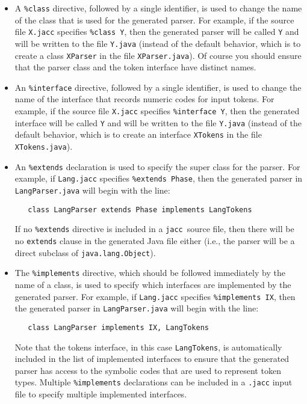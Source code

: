 \documentclass[12pt]{article}
\def\jacc{{\tt jacc}}
\begin{document}
\begin{itemize}
      Note that \jacc\ does not attempt to determine if the text
      in a code block is valid; errors will not be detected until
      you attempt to compile the generated source files.

\item A \verb"%class" directive, followed by a single identifier,
      is used to change the name of the class that is used for
      the generated parser.  For example, if the source file
      \verb"X.jacc" specifies \verb"%class Y", then the generated
      parser will be called \verb"Y" and will be written to
      the file \verb"Y.java" (instead of the default behavior, which
      is to create a class \verb"XParser" in the file \verb"XParser.java").
      Of course you should ensure that the parser class and the token
      interface have distinct names.

\item An \verb"%interface" directive, followed by a single identifier,
      is used to change the name of the interface that 
      records numeric codes for input tokens.  For example, if the
      source file \verb"X.jacc" specifies \verb"%interface Y", then
      the generated interface will be called \verb"Y" and will be
      written to the file \verb"Y.java" (instead of the default
      behavior, which is to create an interface \verb"XTokens"
      in the file \verb"XTokens.java").

\item An \verb"%extends" declaration is used to specify the super class
      for the parser.  For example, if \verb"Lang.jacc"
      specifies \verb"%extends Phase", then the generated
      parser in \verb"LangParser.java" will begin with the line:
\begin{verbatim}
   class LangParser extends Phase implements LangTokens
\end{verbatim}
      If no \verb"%extends" directive is included in a \jacc\ source
      file, then there will be no \verb"extends" clause in the generated
      Java file either (i.e., the parser will be a direct subclass of
      \verb"java.lang.Object").

\item The \verb"%implements" directive, which should be followed
      immediately by the name of a class, is used to specify which
      interfaces are implemented by the generated parser.  For example,
      if \verb"Lang.jacc" specifies \verb"%implements IX", then
      the generated parser in \verb"LangParser.java" will begin with
      the line:
\begin{verbatim}
   class LangParser implements IX, LangTokens
\end{verbatim}
      Note that the tokens interface, in this case \verb"LangTokens",
      is automatically included in the list of implemented interfaces
      to ensure that the generated parser has access to the symbolic
      codes that are used to represent token types.  Multiple
      \verb"%implements" declarations can be included in a \verb".jacc"
      input file to specify multiple implemented interfaces.
\end{itemize}
\end{document}
